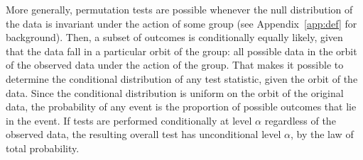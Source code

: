 More generally, permutation tests are possible whenever the
null distribution of the data is invariant under the action of some group (see Appendix~\ref{app:def} for background).
Then, a subset of outcomes is conditionally equally likely, given that the data
fall in a particular orbit of the group: all possible data in the orbit of the
observed data under the action of the group. 
That makes it possible to
determine the conditional distribution of any test statistic, given the orbit
of the data.
Since the conditional distribution is uniform on the orbit of the
original data, the probability of any event is the proportion of possible
outcomes that lie in the event.
If tests are performed conditionally at level $\alpha$ regardless
of the observed data, the resulting overall test has unconditional level
$\alpha$, by the law of total probability.



